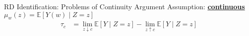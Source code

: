 \begin{frame}{RD Identification: Problems of Continuity Argument}
    Assumption: \textcolor{mygreen}{\textbf{\underline{continuous}}} $\mu_{w}(z)=\mathbb{E}\left[Y(w)\mid Z=z\right]$
    \begin{align*}
        \tau_c &= \lim_{z\downarrow c}\mathbb{E}\left[Y\mid Z=z\right] - \lim_{z\uparrow c} \mathbb{E}\left[ Y\mid Z=z \right]
    \end{align*}

    \vspace*{15pt}

    

\end{frame}
